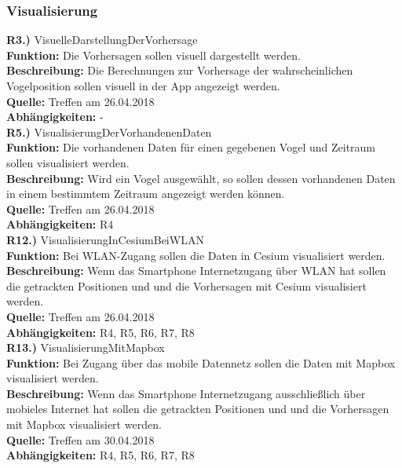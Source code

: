 \documentclass[12pt]{article} %
\begin{document}
\subsubsection{Visualisierung}

\textbf{R3.)} VisuelleDarstellungDerVorhersage \\
\textbf{Funktion:} Die Vorhersagen sollen visuell dargestellt werden. \\
\textbf{Beschreibung:} Die Berechnungen zur Vorhersage der wahrscheinlichen Vogelposition sollen visuell in der App angezeigt werden. \\
\textbf{Quelle:} Treffen am 26.04.2018 \\
\textbf{Abhängigkeiten:} - \\


\textbf{R5.)} VisualisierungDerVorhandenenDaten \\
\textbf{Funktion:} Die vorhandenen Daten für einen gegebenen Vogel und Zeitraum sollen visualisiert werden. \\
\textbf{Beschreibung:} Wird ein Vogel ausgewählt, so sollen dessen vorhandenen Daten in einem bestimmtem Zeitraum angezeigt werden können.\\
\textbf{Quelle:} Treffen am 26.04.2018 \\
\textbf{Abhängigkeiten:} R4 \\


\textbf{R12.)} VisualisierungInCesiumBeiWLAN\\
\textbf{Funktion:} Bei WLAN-Zugang sollen die Daten in Cesium visualisiert werden.\\
\textbf{Beschreibung:} Wenn das Smartphone Internetzugang über WLAN hat sollen die getrackten Positionen und und die Vorhersagen mit Cesium visualisiert werden.\\
\textbf{Quelle:} Treffen am 26.04.2018\\
\textbf{Abhängigkeiten:} R4, R5, R6, R7, R8\\


\textbf{R13.)} VisualisierungMitMapbox\\
\textbf{Funktion:} Bei Zugang über das mobile Datennetz sollen die Daten mit Mapbox visualisiert werden.\\
\textbf{Beschreibung:} Wenn das Smartphone Internetzugang ausschließlich über mobieles Internet hat sollen die getrackten Positionen und und die Vorhersagen mit Mapbox visualisiert werden.\\
\textbf{Quelle:} Treffen am 30.04.2018\\
\textbf{Abhängigkeiten:} R4, R5, R6, R7, R8\\
\end{document}
